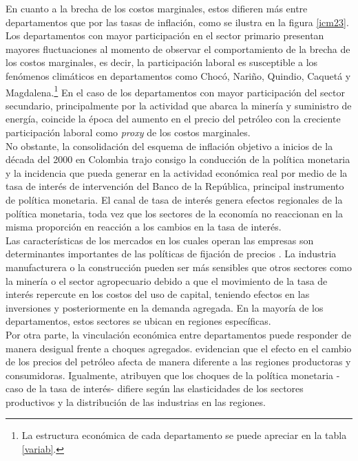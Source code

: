 En cuanto a la brecha de los costos marginales, estos difieren más entre departamentos que por las tasas de inflación, como se ilustra en la figura \ref{icm23}. Los departamentos con mayor participación en el sector primario presentan mayores fluctuaciones al momento de observar el comportamiento de la brecha de los costos marginales, es decir, la participación laboral es susceptible a los fenómenos climáticos  en departamentos como Chocó, Nariño, Quindio, Caquetá y Magdalena.\footnote{La estructura económica de cada departamento se puede apreciar en la tabla \ref{variab}.} En el caso de los departamentos con mayor participación del sector secundario, principalmente por la actividad que abarca la minería y suministro de energía, coincide la época del aumento en el precio del petróleo con la creciente participación laboral como \textit{proxy} de los costos marginales.\\

No obstante, la consolidación del esquema de inflación objetivo a inicios de la década del 2000 en Colombia trajo consigo la conducción de la política monetaria y la incidencia que pueda generar en la actividad económica real por medio de la tasa de interés de intervención del Banco de la República, principal instrumento de política monetaria. El canal de tasa de interés genera efectos regionales de la política monetaria, toda vez  que los sectores de la economía no reaccionan en la misma proporción en reacción a los cambios en la tasa de interés. \\

Las características de los mercados en los cuales operan las empresas son determinantes importantes de las políticas de fijación de precios \citep{misas2009formacion}. La industria manufacturera o la construcción pueden ser más sensibles que otros sectores como la minería o el sector agropecuario debido a que el movimiento de la tasa de interés repercute en los costos del uso de capital, teniendo efectos en las inversiones y posteriormente en la demanda agregada. En la mayoría de los departamentos, estos sectores se ubican en regiones específicas. \\

Por otra parte, la vinculación económica entre departamentos puede responder de manera desigual frente a choques agregados. \cite{carlino1998differential} evidencian que el efecto en el cambio de los precios del petróleo afecta de manera diferente a las regiones productoras y consumidoras. Igualmente, atribuyen que los choques de la política monetaria -caso de la tasa de interés- difiere según las elasticidades de los sectores productivos y la distribución de las industrias en las regiones.\\
   
